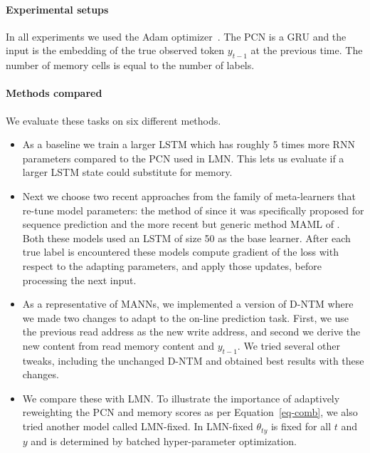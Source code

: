 \documentclass[letterpaper]{article} %
\begin{document}
\paragraph*{Experimental setups}
In all experiments we used the Adam optimizer~\cite{KingmaB14}.  The PCN is a GRU and the input is the embedding of the true observed token $y_{t-1}$ at the previous time.  
The number of memory cells is equal to the number of labels.



\paragraph*{Methods compared}

We evaluate these tasks on six different methods.
\begin{itemize}
\item
As a baseline we train a larger LSTM \cite{Hochreiter97lstm} which has roughly 5 times more RNN parameters compared to the PCN used in LMN.  This lets us evaluate if a larger LSTM state could substitute for memory.
\item
Next we choose two recent approaches from the family of meta-learners that re-tune model parameters: the method of \cite{Rei15} since it was specifically proposed for sequence prediction and the more recent but generic method MAML of \cite{Finn2017ModelAgnosticMF}. Both these models used an LSTM of size 50 as the base learner. After each true label is encountered these models compute gradient of the loss with respect to the adapting parameters, and apply those updates, before processing the next input.

\item
As a representative of MANNs, we implemented a version of D-NTM \cite{GulcehreCCB16} where we made two changes to adapt to the on-line prediction task. First, we use the previous read address as the new write address, and second we derive the new content from read memory content and $y_{t-1}$. We tried several other tweaks, including the unchanged D-NTM and obtained best results with these changes.

\item We compare these with LMN. To illustrate the importance of adaptively reweighting the PCN and memory scores as per Equation~\ref{eq-comb}, we also tried another model called LMN-fixed.  In LMN-fixed $\theta_{ty}$ is fixed for all $t$ and $y$ and is determined by batched hyper-parameter optimization.
\end{itemize}
\end{document}
